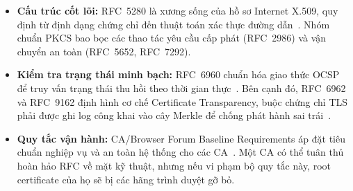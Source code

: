\begin{itemize}
    \item \textbf{Cấu trúc cốt lõi:} RFC~5280 là xương sống của hồ sơ Internet X.509, quy định từ định dạng chứng chỉ đến thuật toán xác thực đường dẫn~\cite{RFC5280}. Nhóm chuẩn PKCS bao bọc các thao tác yêu cầu cấp phát (RFC~2986) và vận chuyển an toàn (RFC~5652, RFC~7292).
    \item \textbf{Kiểm tra trạng thái minh bạch:} RFC~6960 chuẩn hóa giao thức OCSP để truy vấn trạng thái thu hồi theo thời gian thực~\cite{RFC6960}. Bên cạnh đó, RFC~6962 và RFC~9162 định hình cơ chế Certificate Transparency, buộc chứng chỉ TLS phải được ghi log công khai vào cây Merkle để chống phát hành sai trái~\cite{RFC6962, RFC9162}.
    \item \textbf{Quy tắc vận hành:} CA/Browser Forum Baseline Requirements áp đặt tiêu chuẩn nghiệp vụ và an toàn hệ thống cho các CA~\cite{CABForum}. Một CA có thể tuân thủ hoàn hảo RFC về mặt kỹ thuật, nhưng nếu vi phạm bộ quy tắc này, root certificate của họ sẽ bị các hãng trình duyệt gỡ bỏ.
\end{itemize}
